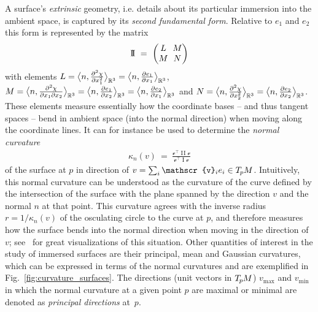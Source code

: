 A surface's \emph{extrinsic} geometry, i.e. details about its particular immersion into the ambient space, is captured by its \emph{second fundamental form}.
Relative to $e_1$ and $e_2$ this form is represented by the matrix
\begin{align}
    \operatorname{I\!I}
    \ =\ 
    \begin{pmatrix}
           L \mkern-8mu& M \\
           M \mkern-8mu& N
    \end{pmatrix}
\end{align}
with elements
$L = \big\langle n, \frac{\partial^2\chi}{\partial x_1^2} \big\rangle_{\mathbb{R}^3}
   = \big\langle n, \frac{\partial e_1}{\partial x_1} \big\rangle_{\mathbb{R}^3}$,
$M = \big\langle n, \frac{\partial^2\chi}{\partial x_1 \partial x_2} \big\rangle_{\mathbb{R}^3}
   = \big\langle n, \frac{\partial e_1}{\partial x_2} \big\rangle_{\mathbb{R}^3}
   = \big\langle n, \frac{\partial e_2}{\partial x_1} \big\rangle_{\mathbb{R}^3}$
and
$N = \big\langle n, \frac{\partial^2\chi}{\partial x_2^2} \big\rangle_{\mathbb{R}^3}
   = \big\langle n, \frac{\partial e_2}{\partial x_2} \big\rangle_{\mathbb{R}^3}$.
These elements measure essentially how the coordinate bases -- and thus tangent spaces -- bend in ambient space (into the normal direction) when moving along the coordinate lines.
It can for instance be used to determine the \emph{normal curvature}
\begin{align}
    \kappa_n(v)\ =\ \frac{\mathscr{v}^\top \operatorname{I\!I}\mathscr{v}}{\mathscr{v}^\top \operatorname{I}\mathscr{v}}
\end{align}
of the surface at $p$ in direction of $v = \sum_i \mathscr{v}_i e_i \in \TpM$.
Intuitively, this normal curvature can be understood as the curvature of the curve defined by the intersection of the surface with the plane spanned by the direction $v$ and the normal $n$ at that point.
This curvature agrees with the inverse radius $r=1/\kappa_n(v)$ of the osculating circle to the curve at $p$, and therefore measures how the surface bends into the normal direction when moving in the direction of $v$; see~\cite{craneDiscreteDifferentialGeometry2014} for great visualizations of this situation.
Other quantities of interest in the study of immersed surfaces are their principal, mean and Gaussian curvatures, which can be expressed in terms of the normal curvatures and are exemplified in Fig.~\ref{fig:curvature_surfaces}.
The directions (unit vectors in $T_{\mkern-1.5mu p}\mkern-.5muM$) $v_{\max}$ and $v_{\min}$ in which the normal curvature at a given point $p$ are maximal or minimal are denoted as \emph{principal directions} at~$p$.
